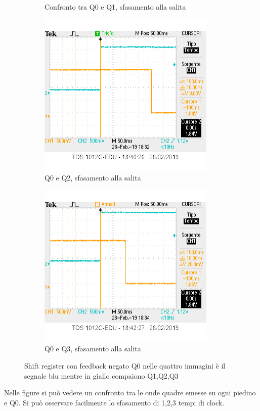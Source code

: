 \documentclass[10pt,a4paper]{article}
\begin{document}
\begin{figure}[h]
\begin{subfigure}[b]{0.4\linewidth}
		\caption{Confronto tra Q0 e Q1, sfasamento alla salita}
	\end{subfigure}
	\newline
	\begin{subfigure}[b]{0.4\linewidth}
		\includegraphics[width=\linewidth]{q0q2sr.png}
		\caption{Q0 e Q2, sfasamento alla salita}
	\end{subfigure}
	\begin{subfigure}[b]{0.4\linewidth}
		\includegraphics[width=\linewidth]{q0q3sr.png}
		\caption{Q0 e Q3, sfasamento alla salita}
	\end{subfigure}
	\caption{Shift register con feedback negato Q0 nelle quattro immagini è il segnale blu mentre in giallo compaiono Q1,Q2,Q3}
\end{figure}

Nelle figure si può  vedere un confronto tra le onde quadre emesse su ogni piedino e Q0. Si può osservare facilmente lo sfasamento di 1,2,3 tempi di clock.
\end{document}
